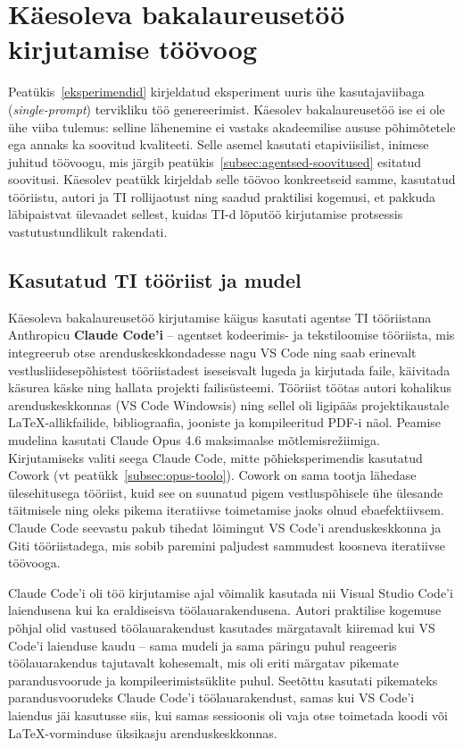 \section{Käesoleva bakalaureusetöö kirjutamise töövoog} \label{toovoog}

Peatükis~\ref{eksperimendid} kirjeldatud eksperiment uuris ühe kasutajaviibaga (\textit{single-prompt}) tervikliku töö genereerimist. Käesolev bakalaureusetöö ise ei ole ühe viiba tulemus: selline lähenemine ei vastaks akadeemilise aususe põhimõtetele ega annaks ka soovitud kvaliteeti. Selle asemel kasutati etapiviisilist, inimese juhitud töövoogu, mis järgib peatükis~\ref{subsec:agentsed-soovitused} esitatud soovitusi. Käesolev peatükk kirjeldab selle töövoo konkreetseid samme, kasutatud tööriistu, autori ja TI rollijaotust ning saadud praktilisi kogemusi, et pakkuda läbipaistvat ülevaadet sellest, kuidas TI-d lõputöö kirjutamise protsessis vastutustundlikult rakendati.

\subsection{Kasutatud TI tööriist ja mudel} \label{subsec:tooriist-mudel}

Käesoleva bakalaureusetöö kirjutamise käigus kasutati agentse TI tööriistana Anthropicu \textbf{Claude Code'i} -- agentset kodeerimis- ja tekstiloomise tööriista, mis integreerub otse arenduskeskkondadesse nagu VS Code \cite{anthropic2026claudecode} ning saab erinevalt vestlusliidesepõhistest tööriistadest iseseisvalt lugeda ja kirjutada faile, käivitada käsurea käske ning hallata projekti failisüsteemi. Tööriist töötas autori kohalikus arenduskeskkonnas (VS Code Windowsis) ning sellel oli ligipääs projektikaustale \LaTeX{}-allikfailide, bibliograafia, jooniste ja kompileeritud PDF-i näol. Peamise mudelina kasutati Claude Opus 4.6 maksimaalse mõtlemisrežiimiga. Kirjutamiseks valiti seega Claude Code, mitte põhieksperimendis kasutatud Cowork (vt peatükk~\ref{subsec:opus-toolo}). Cowork on sama tootja lähedase ülesehitusega tööriist, kuid see on suunatud pigem vestluspõhisele ühe ülesande täitmisele ning oleks pikema iteratiivse toimetamise jaoks olnud ebaefektiivsem. Claude Code seevastu pakub tihedat lõimingut VS Code'i arenduskeskkonna ja Giti tööriistadega, mis sobib paremini paljudest sammudest koosneva iteratiivse töövooga.

Claude Code'i oli töö kirjutamise ajal võimalik kasutada nii Visual Studio Code'i laiendusena kui ka eraldiseisva töölauarakendusena. Autori praktilise kogemuse põhjal olid vastused töölauarakendust kasutades märgatavalt kiiremad kui VS Code'i laienduse kaudu -- sama mudeli ja sama päringu puhul reageeris töölauarakendus tajutavalt kohesemalt, mis oli eriti märgatav pikemate parandusvoorude ja kompileerimistsüklite puhul. Seetõttu kasutati pikemateks parandusvoorudeks Claude Code'i töölauarakendust, samas kui VS Code'i laiendus jäi kasutusse siis, kui samas sessioonis oli vaja otse toimetada koodi või \LaTeX{}-vorminduse üksikasju arenduskeskkonnas.

